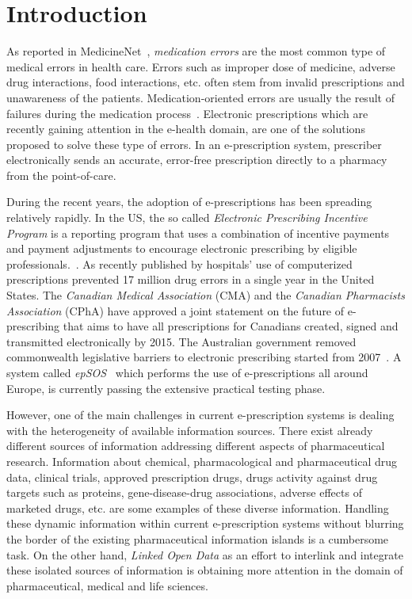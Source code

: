 \documentclass[conference]{IEEEtran}
\begin{document}
\section{Introduction}
\label{intro}

As reported in MedicineNet~\cite{medicationErrors}, \emph{medication errors} are the most common type of medical errors in health care.
Errors such as improper dose of medicine, adverse drug interactions, food interactions, etc. often stem from invalid prescriptions and unawareness of the patients.
Medication-oriented errors are usually the result of failures during the medication process~\cite{SemMed}.
Electronic prescriptions which are recently gaining attention in the e-health domain, are one of the solutions proposed to solve these type of errors.
In an e-prescription system, prescriber electronically sends an accurate, error-free prescription directly to a pharmacy from the point-of-care.

During the recent years, the adoption of e-prescriptions has been spreading relatively rapidly.
In the US, the so called \emph{Electronic Prescribing Incentive Program} is a reporting program that uses a combination of incentive payments and payment adjustments to encourage electronic prescribing by eligible professionals.~\cite{epincentive}.
As recently published by \cite{eprescStat2013} hospitals' use of computerized prescriptions prevented 17 million drug errors in a single year in the United States.
The \emph{Canadian Medical Association} (CMA) and the \emph{Canadian Pharmacists Association} (CPhA) have approved a joint statement on the future of e-prescribing that aims to have all prescriptions for Canadians created, signed and transmitted electronically by 2015.
The Australian government removed commonwealth legislative barriers to electronic prescribing started from 2007~\cite{medicare}.
A system called \emph{epSOS}~\cite{epsos} which performs the use of e-prescriptions all around Europe, is currently passing the extensive practical testing phase.

However, one of the main challenges in current e-prescription systems is dealing with the heterogeneity of available information sources.
There exist already different sources of information addressing different aspects of pharmaceutical research.
Information about chemical, pharmacological and pharmaceutical drug data, clinical trials, approved prescription drugs, drugs activity against drug targets such as proteins, gene-disease-drug associations, adverse effects of marketed drugs, etc. are some examples of these diverse information.
Handling these dynamic information within current e-prescription systems without blurring the border of the existing pharmaceutical information islands is a cumbersome task.
On the other hand, \emph{Linked Open Data} as an effort to interlink and integrate these isolated sources of information is obtaining more attention in the domain of pharmaceutical, medical and life sciences.
\end{document}
